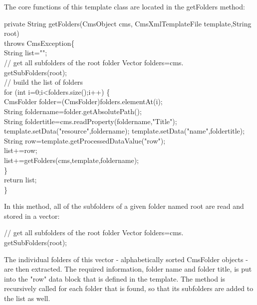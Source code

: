 The core functions of this template class are located in the {\meth getFolders}
method:

\begin{java}
private String getFolders(CmsObject cms, CmsXmlTemplateFile template,String root)\\
\jtabc        throws CmsException\{\\
\jtabd           String list="";\\
// get all subfolders of the root folder Vector folders=cms.\\
getSubFolders(root);\\
\jtabd           // build the list of folders\\
\jtabd           for (int i=0;i<folders.size();i++) \{\\
\jtabd           CmsFolder folder=(CmsFolder)folders.elementAt(i);\\
\jtabd           String foldername=folder.getAbsolutePath();\\
String      foldertitle=cms.readProperty(foldername,"Title");\\
template.setData("resource",foldername); template.setData("name",foldertitle);\\
\jtabd           String row=template.getProcessedDataValue("row");\\
\jtabd           list+=row;\\
\jtabd           list+=getFolders(cms,template,foldername);\\
\jtabc        \}\\
\jtabc        return list;\\
\}\\
\end{java}

In this method, all of the subfolders of a given folder named {\name root}
are read and stored in a vector:

\begin{java}
// get all subfolders of the root folder Vector folders=cms.\\
getSubFolders(root);\\
\end{java}

The individual folders of this vector - alphabetically sorted CmsFolder
objects - are then extracted. The required information, folder name and
folder title, is put into the "row" data block that is defined in the
template. The method is recursively called for each folder that is
found, so that its subfolders are added to the list as well.\\

